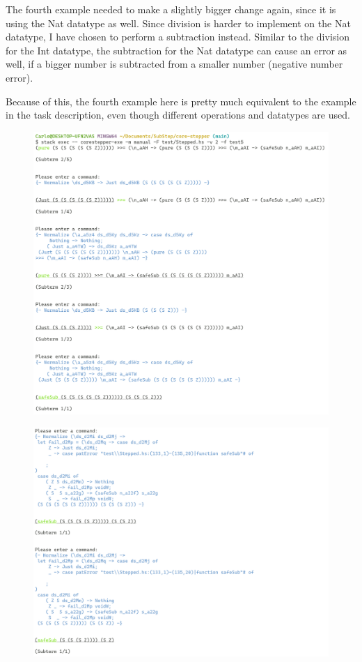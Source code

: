 \clearpage
The fourth example needed to make a slightly bigger change again,
since it is using the Nat datatype as well.
Since division is harder to implement on the Nat datatype,
I have chosen to perform a subtraction instead.
Similar to the division for the Int datatype,
the subtraction for the Nat datatype can cause an error as well,
if a bigger number is subtracted from a smaller number (negative number error).

Because of this,
the fourth example here is pretty much equivalent to the example in the task description,
even though different operations and datatypes are used.

\begin{figure}
    \includegraphics[width=1\textwidth]{resources/bind_part_1.PNG}
\end{figure}
\begin{figure}
    \includegraphics[width=1\textwidth]{resources/bind_part_2.PNG}
\end{figure}
